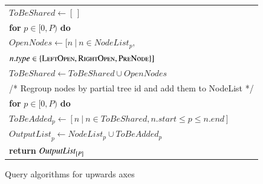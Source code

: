 \begin{figure}[t]
\begin{tabular}{l}
		\makebox[1em][r]{2:}\hspace{1 mm} $\mathit{ToBeShared} \leftarrow [\,]$ \\
		\makebox[1em][r]{3:}\hspace{1 mm} \textbf{for} $p \in [0, P)$ \textbf{do} \\
		\makebox[1em][r]{4:}\hspace{4 mm} $ \mathit{OpenNodes} \leftarrow [n ~|~ n \in \mathit{NodeList}_p, $\\
		\makebox[1em][r]{5:}\hspace{4 mm} \phantom{$ \mathit{OpenNodes} \leftarrow [n ~|~$}$n.\mathit{type} \in \{\textsc{LeftOpen}, \textsc{RightOpen}, \textsc{PreNode}\}]$\\
		\makebox[1em][r]{6:}\hspace{4 mm} $ \mathit{ToBeShared} \leftarrow \mathit{ToBeShared} \cup \mathit{OpenNodes}$ \\[5pt]
		\makebox[1em][r]{7:}\hspace{1 mm} /* Regroup nodes by partial tree id and add them to NodeList */ \\
		\makebox[1em][r]{8:}\hspace{1 mm} \textbf{for} $p \in [0, P)$ \textbf{do} \\
		\makebox[1em][r]{9:}\hspace{4 mm}    $\mathit{ToBeAdded}_p \leftarrow [n ~|~ n \in \mathit{ToBeShared}, n.\mathit{start} \le p \le n.\mathit{end}]$ \\
		\makebox[1em][r]{10:}\hspace{4 mm}    $\mathit{OutputList}_p \leftarrow \mathit{NodeList}_p \cup \mathit{ToBeAdded}_p$ \\
		\makebox[1em][r]{11:}\hspace{1 mm} \textbf{return} $\mathit{OutputList}_{[P]}$ \\ 
		\hline 
	\end{tabular}
        \caption{Query algorithms for upwards axes}
	\label{fig:algQueryParent2}
\end{figure}	
